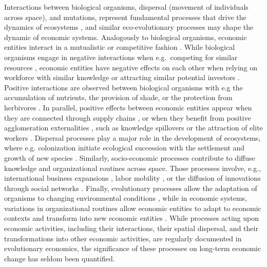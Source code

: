   Interactions between biological organisms, dispersal (movement of individuals across space), and mutations, represent fundamental processes that drive the dynamics of ecosystems \citep{Vellend2010}, and similar eco-evolutionary processes may shape the dynamic of economic systems.
  Analogously to biological organisms, economic entities interact in a mutualistic or competitive fashion \citep{Pistorius1997}. While biological organisms engage in negative interactions when e.g.~competing for similar resources \citep{GRIME1973}, economic entities have negative effects on each other when relying on workforce with similar knowledge or attracting similar potential investors \citep{Wernerfelt1989}.
  Positive interactions are observed between biological organisms with e.g the accumulation of nutrients, the provision of shade, or the protection from herbivores \citep{Callaway2002}. In parallel, positive effects between economic entities appear when they are connected through supply chains \citep{Ozman2009,Saavedra2009a}, or when they benefit from positive agglomeration externalities \citep{VanDerPanne2004}, such as knowledge spillovers \citep{Caragliu2016} or the attraction of elite workers \citep{Cohendet2018}.
  Dispersal processes play a major role in the development of ecosystems, where e.g. colonization initiate ecological succession with the settlement and growth of new species \citep{Leibold2004}. Similarly, socio-economic processes contribute to diffuse knowledge and organizational routines across space. Those processes involve, e.g., international business expansions \citep{Andersen1993,Zahra2000,Luo2007}, labor mobility \citep{Boschma2008}, or the diffusion of innovations through social networks \citep{RogersEverettM2003DoI,Keller2004,Bahar2014a}.
  Finally, evolutionary processes allow the adaptation of organisms to changing environmental conditions \citep{Bell2017}, while in economic systems, variations in organizational routines allow economic entities to adapt to economic contexts \citep{Cordes2006} and transform into new economic entities \citep{Freeman2002,Hodgson2004,Aldrich2008}. %
  While processes acting upon economic activities, including their interactions, their spatial dispersal, and their transformations into other economic activities, are regularly documented in evolutionary economics, the significance of these processes on long-term economic change has seldom been quantified.%

